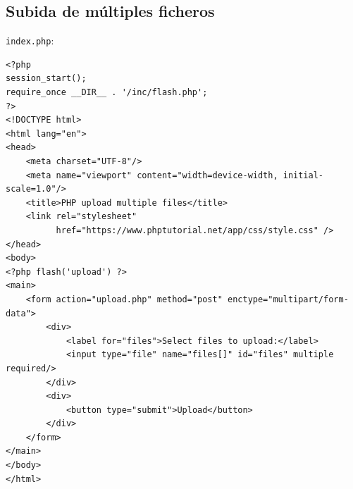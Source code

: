 \documentclass[11pt]{article}
\begin{document}
\subsection{Subida de múltiples ficheros}
\label{sec:orgd4acab2}
\texttt{index.php}:
\begin{verbatim}
<?php
session_start();
require_once __DIR__ . '/inc/flash.php';
?>
<!DOCTYPE html>
<html lang="en">
<head>
    <meta charset="UTF-8"/>
    <meta name="viewport" content="width=device-width, initial-scale=1.0"/>
    <title>PHP upload multiple files</title>
    <link rel="stylesheet"
          href="https://www.phptutorial.net/app/css/style.css" />
</head>
<body>
<?php flash('upload') ?>
<main>
    <form action="upload.php" method="post" enctype="multipart/form-data">
        <div>
            <label for="files">Select files to upload:</label>
            <input type="file" name="files[]" id="files" multiple required/>
        </div>
        <div>
            <button type="submit">Upload</button>
        </div>
    </form>
</main>
</body>
</html>
\end{verbatim}
\end{document}
